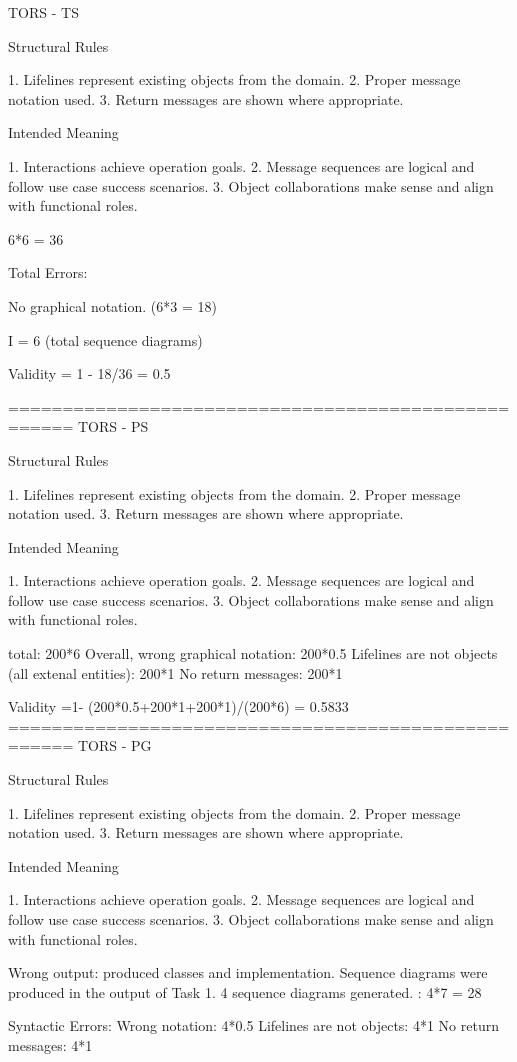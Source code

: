 TORS - TS

Structural Rules

1. Lifelines represent existing objects from the domain.
2. Proper message notation used.
3. Return messages are shown where appropriate.

Intended Meaning

1. Interactions achieve operation goals.
2. Message sequences are logical and follow use case success scenarios.
3. Object collaborations make sense and align with functional roles.

6*6 = 36

Total Errors: 

No graphical notation. (6*3 = 18)

I = 6 (total sequence diagrams)

Validity = 1 - 18/36 = 0.5

====================================================
TORS - PS

Structural Rules

1. Lifelines represent existing objects from the domain.
2. Proper message notation used.
3. Return messages are shown where appropriate.

Intended Meaning

1. Interactions achieve operation goals.
2. Message sequences are logical and follow use case success scenarios.
3. Object collaborations make sense and align with functional roles.

total: 200*6
Overall, wrong graphical notation: 200*0.5
Lifelines are not objects (all extenal entities): 200*1
No return messages: 200*1


Validity =1- (200*0.5+200*1+200*1)/(200*6) = 0.5833
====================================================
TORS - PG

Structural Rules

1. Lifelines represent existing objects from the domain.
2. Proper message notation used.
3. Return messages are shown where appropriate.

Intended Meaning

1. Interactions achieve operation goals.
2. Message sequences are logical and follow use case success scenarios.
3. Object collaborations make sense and align with functional roles.

Wrong output: produced classes and implementation.
Sequence diagrams were produced in the output of Task 1. 
4 sequence diagrams generated. : 4*7 = 28

Syntactic Errors: 
Wrong notation: 4*0.5
Lifelines are not objects: 4*1
No return messages: 4*1 

